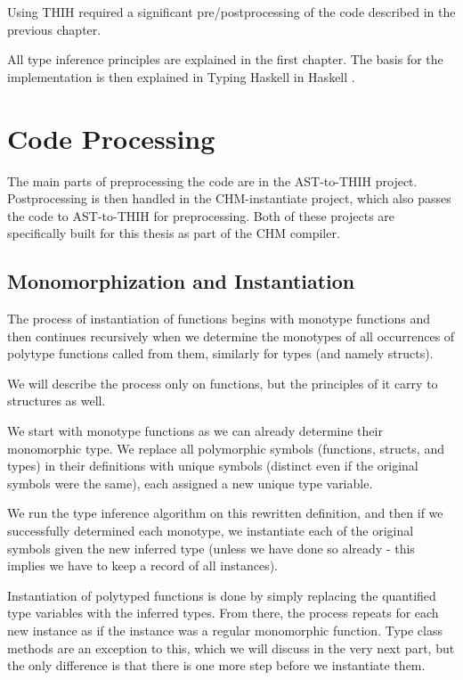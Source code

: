 Using THIH required a significant pre/postprocessing of the code described in the previous chapter.

All type inference principles are explained in the first chapter. The basis for the implementation is then explained in Typing Haskell in Haskell \cite{jones1999typing}.

\section{Code Processing}

The main parts of preprocessing the code are in the AST-to-THIH project. Postprocessing is then handled in the CHM-instantiate project, which also passes the code to AST-to-THIH for preprocessing. Both of these projects are specifically built for this thesis as part of the CHM compiler.

\subsection{Monomorphization and Instantiation}

The process of instantiation of functions begins with monotype functions and then continues recursively when we determine the monotypes of all occurrences of polytype functions called from them, similarly for types (and namely structs).

We will describe the process only on functions, but the principles of it carry to structures as well.

We start with monotype functions as we can already determine their monomorphic type. We replace all polymorphic symbols (functions, structs, and types) in their definitions with unique symbols (distinct even if the original symbols were the same), each assigned a new unique type variable.

We run the type inference algorithm on this rewritten definition, and then if we successfully determined each monotype, we instantiate each of the original symbols given the new inferred type (unless we have done so already - this implies we have to keep a record of all instances).

Instantiation of polytyped functions is done by simply replacing the quantified type variables with the inferred types. From there, the process repeats for each new instance as if the instance was a regular monomorphic function. Type class methods are an exception to this, which we will discuss in the very next part, but the only difference is that there is one more step before we instantiate them.

